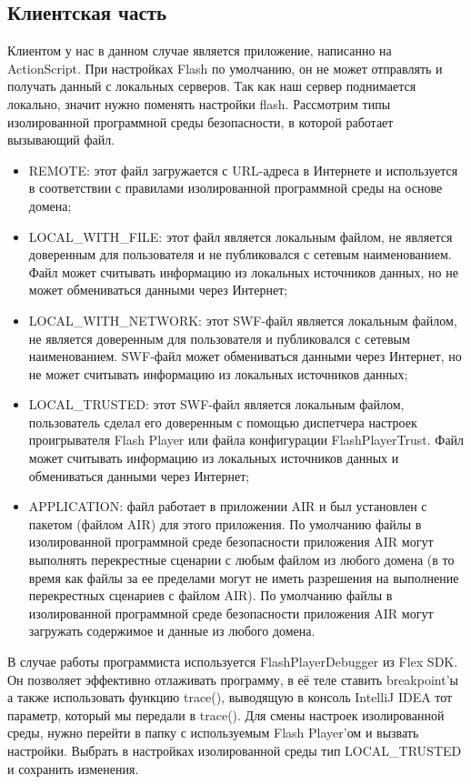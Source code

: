 \subsection{Клиентская часть}
Клиентом у нас в данном случае является приложение, написанно на ActionScript. При настройках Flash по умолчанию, он не может отправлять и получать данный с локальных серверов. Так как наш сервер поднимается локально, значит нужно поменять настройки flash. Рассмотрим типы изолированной программной среды безопасности, в которой работает вызывающий файл.
\begin{itemize}
  \item REMOTE: этот файл загружается с URL-адреса в Интернете и используется в соответствии с правилами изолированной программной среды на основе домена;
  \item LOCAL\_WITH\_FILE: этот файл является локальным файлом, не является доверенным для пользователя и не публиковался с сетевым наименованием. Файл может считывать информацию из локальных источников данных, но не может обмениваться данными через Интернет;
  \item LOCAL\_WITH\_NETWORK: этот SWF-файл является локальным файлом, не является доверенным для пользователя и публиковался с сетевым наименованием. SWF-файл может обмениваться данными через Интернет, но не может считывать информацию из локальных источников данных;
  \item LOCAL\_TRUSTED: этот SWF-файл является локальным файлом, пользователь сделал его доверенным с помощью диспетчера настроек проигрывателя Flash Player или файла конфигурации FlashPlayerTrust. Файл может считывать информацию из локальных источников данных и обмениваться данными через Интернет;
  \item APPLICATION: файл работает в приложении AIR и был установлен с пакетом (файлом AIR) для этого приложения. По умолчанию файлы в изолированной программной среде безопасности приложения AIR могут выполнять перекрестные сценарии с любым файлом из любого домена (в то время как файлы за ее пределами могут не иметь разрешения на выполнение перекрестных сценариев с файлом AIR). По умолчанию файлы в изолированной программной среде безопасности приложения AIR могут загружать содержимое и данные из любого домена. 
\end{itemize}

В случае работы программиста используется FlashPlayerDebugger из Flex SDK. Он позволяет эффективно отлаживать программу, в её теле ставить breakpoint'ы а также использовать функцию trace(), выводящую в консоль IntelliJ IDEA тот параметр, который мы передали в trace().
Для смены настроек изолированной среды, нужно перейти в папку с используемым Flash Player'ом и вызвать настройки. Выбрать в настройках изолированной среды тип LOCAL\_TRUSTED и сохранить изменения.

